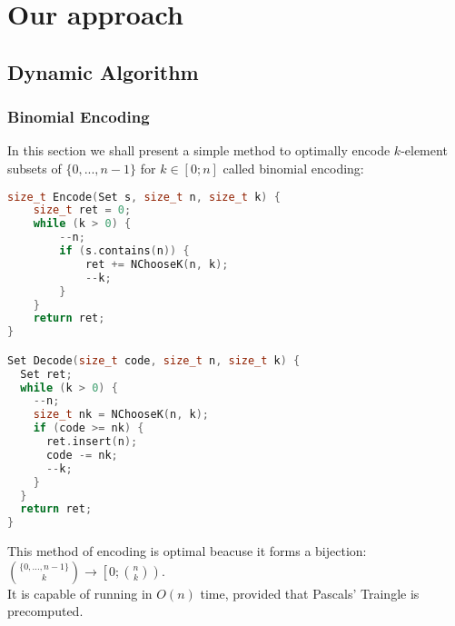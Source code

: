 \section{Our approach}
\subsection{Dynamic Algorithm}
\subsubsection{Binomial Encoding~\cite{binomial_encoding}}
In this section we shall present a simple method to optimally encode $k$-element subsets of $\{0,...,n-1\}$ for $k\in\left[0;n\right]$ called binomial encoding:
\begin{lstlisting}[language=C++]
size_t Encode(Set s, size_t n, size_t k) {
	size_t ret = 0;
	while (k > 0) {
		--n;
		if (s.contains(n)) {
			ret += NChooseK(n, k);
			--k;
		}
	}
	return ret;
}

Set Decode(size_t code, size_t n, size_t k) {
  Set ret;
  while (k > 0) {
    --n;
    size_t nk = NChooseK(n, k);
    if (code >= nk) {
      ret.insert(n);
      code -= nk;
      --k;
    }
  }
  return ret;
}
\end{lstlisting}
This method of encoding is optimal beacuse it forms a bijection: $\binom{\{0,...,n-1\}}{k}\rightarrow\left[0; \binom{n}{k}\right)$.\\
It is capable of running in $O(n)$ time, provided that Pascals' Traingle is precomputed.
